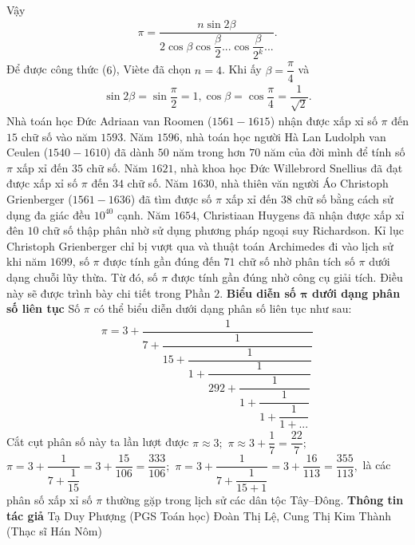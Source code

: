 \begin{multicols}{2}
\begin{align*}
	\end{align*}
	Vậy  
	\begin{align*}
		\pi  = \dfrac{{n\sin 2\beta }}{{2\cos \beta \cos \dfrac{\beta }{2}...\cos \dfrac{\beta }{{{2^k}}}...}}.
	\end{align*}
	Để được công thức ($6$), Viète đã chọn $n = 4$. Khi ấy $\beta  = \dfrac{\pi }{4}$  và 
	\begin{align*}
		\sin 2\beta  = \sin \dfrac{\pi }{2} = 1, \cos \beta  = \cos \dfrac{\pi }{4} = \dfrac{1}{{\sqrt 2 }}.
	\end{align*}
	Nhà toán học Đức Adriaan van Roomen ($1561-1615$) nhận được xấp xỉ số  $\pi$ đến $15$ chữ số vào năm $1593$.
	\vskip 0.1cm 
	Năm $1596$, nhà toán học người Hà Lan Ludolph van Ceulen ($1540-1610$) đã dành $50$ năm trong hơn $70$ năm của đời mình để tính số $\pi$   xấp xỉ đến $35$ chữ số.
	\vskip 0.1cm 
	Năm $1621$, nhà khoa học Đức Willebrord Snellius đã đạt được xấp xỉ số $\pi$  đến $34$ chữ số.
	\vskip 0.1cm
	Năm $1630$, nhà thiên văn người Áo Christoph Grienberger ($1561-1636$) đã tìm được số $\pi$ xấp xỉ đến $38$ chữ số bằng cách sử dụng đa giác đều  $10^{40}$ cạnh.
	\vskip 0.1cm 
	Năm $1654$, Christiaan Huygens đã nhận được xấp xỉ đên $10$ chữ số thập phân nhờ sử dụng phương pháp ngoại suy Richardson.  
	\vskip 0.1cm
	Kỉ lục Christoph Grienberger chỉ bị vượt qua và thuật toán Archimedes đi vào lịch sử khi năm $1699$, số  $\pi$ được tính gần đúng đến $71$ chữ số nhờ phân tích số  $\pi$ dưới dạng chuỗi lũy thừa. Từ đó, số $\pi$ được tính gần đúng nhờ công cụ giải tích. Điều này sẽ được trình bày chi tiết trong Phần $2$.
	\vskip 0.1cm 
	\textbf{\color{lichsutoanhoc}Biểu diễn số $\pmb{\pi}$  dưới dạng phân số liên tục}
	\vskip 0.1cm
	Số $\pi$  có thể biểu diễn dưới dạng phân số liên tục như sau: 
	\begin{align*}
		\pi  = 3 + \dfrac{1}{{7 + \dfrac{1}{{15 + \dfrac{1}{{1 + \dfrac{1}{{292 + \dfrac{1}{{1 + \dfrac{1}{{1 + \dfrac{1}{{1 + ...}}}}}}}}}}}}}}
	\end{align*}
	Cắt cụt phân số này ta lần lượt được  $\pi  \approx 3;$  $\pi  \approx 3 + \dfrac{1}{7} = \dfrac{{22}}{7};$ $\pi  = 3 + \dfrac{1}{{7 + \dfrac{1}{{15}}}} = 3 + \dfrac{{15}}{{106}} = \dfrac{{333}}{{106}};$ $\pi  = 3 + \dfrac{1}{{7 + \dfrac{1}{{15 + 1}}}} = 3 + \dfrac{{16}}{{113}} = \dfrac{{355}}{{113}},$
	là các phân số xấp xỉ số $\pi$ thường gặp trong lịch sử các dân tộc Tây--Đông.
	\vskip 0.1cm
	\textbf{\color{lichsutoanhoc}Thông tin tác giả}
	\vskip 0.1cm
	Tạ Duy Phượng (PGS Toán học)
	\vskip 0.1cm
	Đoàn Thị Lệ, Cung Thị Kim Thành (Thạc sĩ Hán Nôm)

\end{multicols}
